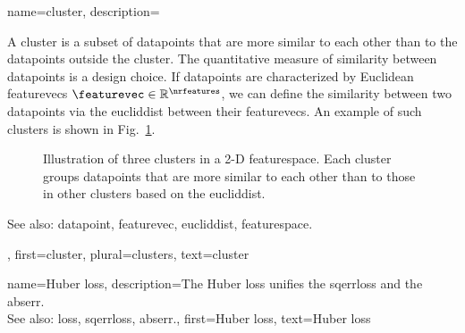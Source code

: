 {name={cluster},
	description={A cluster is a subset of 
		\glspl{datapoint} that are more similar to each other than to the \glspl{datapoint} outside the cluster. 
		The quantitative \gls{measure} of similarity between \glspl{datapoint} is a design choice. If \glspl{datapoint} 
		are characterized by Euclidean \glspl{featurevec} $\featurevec \in \mathbb{R}^{\nrfeatures}$, 
		we can define the similarity between two \glspl{datapoint} via the \gls{eucliddist} between 
		their \glspl{featurevec}. An example of such clusters is shown in Fig.\ \ref{fig:clusters_dict}.
		\begin{figure}[H]
		\centering
		\caption{Illustration of three clusters in a 2-D \gls{featurespace}. Each cluster groups \glspl{datapoint} 
			that are more similar to each other than to those in other clusters based on the \gls{eucliddist}.}
			\label{fig:clusters_dict}
		\end{figure}
		See also: \gls{datapoint}, \gls{featurevec}, \gls{eucliddist}, \gls{featurespace}.},
	first={cluster},
	plural={clusters}, 
	text={cluster} 
}

{name={Huber loss}, 
	description={The 
		Huber \gls{loss} unifies the \gls{sqerrloss} and the \gls{abserr}.
				\\
		See also: \gls{loss}, \gls{sqerrloss}, \gls{abserr}.},
	first={Huber loss},
	text={Huber loss} 
}

